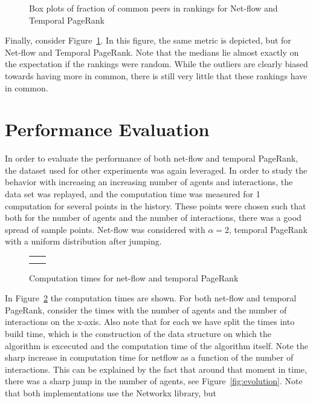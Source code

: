 \documentclass[a4paper,11pt]{book}
\theoremstyle{definition}
\begin{document}
\begin{figure}[ht]
    \centering
    
    \caption{Box plots of fraction of common peers in rankings for Net-flow and Temporal PageRank}
    \label{fig:box_netflow_tpr}
\end{figure}

Finally, consider Figure~\ref{fig:box_netflow_tpr}. In this figure, the same metric is depicted, but
for Net-flow and Temporal PageRank. Note that the medians lie almost exactly on the expectation
if the rankings were random. While the outliers are clearly biased towards having more in common,
there is still very little that these rankings have in common.

\section{Performance Evaluation}

In order to evaluate the performance of both net-flow and temporal PageRank, the dataset used for
other experiments was again leveraged. In order to study the behavior with increasing an increasing
number of agents and interactions, the data set was replayed, and the computation time was measured
for 1 computation for several points in the history. These points were chosen such that
both for the number of agents and the number of interactions, there was a good spread of
sample points.
Net-flow was considered with $\alpha=2$, temporal PageRank with a uniform
distribution after jumping. 

\begin{figure}[ht]
    \centering
    \begin{tabular}[ht]{cc}
         &
         \\
         &
         \\

    \end{tabular}
    \caption{Computation times for net-flow and temporal PageRank}
    \label{fig:performance}
\end{figure}

In Figure~\ref{fig:performance} the computation times are shown. For both net-flow and temporal PageRank,
consider the times with the number of agents and the number of interactions on the x-axis. Also note
that for each we have split the times into build time, which is the construction of the data structure
on which the algorithm is excecuted and the computation time of the algorithm itself. Note the sharp
increase in computation time for netflow as a function of the number of interactions. This can be
explained by the fact that around that moment in time, there was a sharp jump in the number of agents,
see Figure~\ref{fig:evolution}. Note that both implementations use the Networkx library, but 
\end{document}
